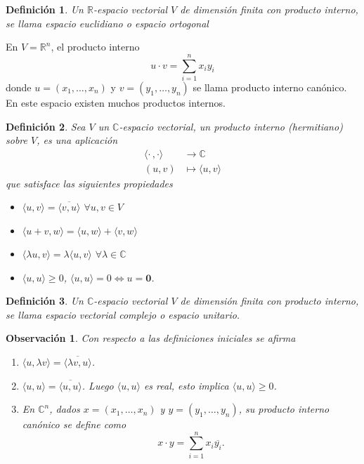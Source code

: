 \documentclass[b5paper, 11pt]{book}
\newcommand{\0}{\mathbf{0}}
\newcommand{\R}{\mathds{R}}
\newtheorem{obs}{Observación}[chapter]
\theoremstyle{estiloB}
\theoremstyle{estiloC}
\newtheorem{unadefi}{Definición}[chapter]
\theoremstyle{estiloD}
\begin{document}
\begin{unadefi}
Un $\R$-espacio vectorial $V$ de dimensi\'on finita con producto interno, se llama espacio euclidiano o espacio ortogonal
\end{unadefi}

En $V= \R^{n}$, el producto interno
\[
u \cdot v= \sum_{i=1}^{n}x_{i}y_{i} 
\]
donde $u=(x_{1}, \ldots, x_{n})$ y $v=(y_{1}, \ldots , y_{n})$ se llama producto interno can\'onico. En este espacio existen muchos productos internos.

\begin{unadefi}
Sea $V$ un $\mathds{C}$-espacio vectorial, un producto interno (hermitiano) sobre $V$, es una aplicaci\'on
\begin{align*}
\langle \mathbf{\cdot} \, , \mathbf{\cdot} \rangle	&\to \mathds{C}\\
(u,v)							&\mapsto \langle u, v \rangle
\end{align*}
que satisface las siguientes propiedades
\begin{itemize}
\item[\textit{i)}] $\langle u,v \rangle = \overline{\langle v,u\rangle}$ $\forall u,v \in V$
\item[\textit{ii)}] $\langle u+v, w \rangle= \langle u,w \rangle + \langle v,w \rangle$
\item[\textit{iii)}] $\langle \lambda u, v \rangle= \lambda \langle u,v \rangle$ $\forall \lambda \in \mathds{C}$
\item[\textit{iv)}] $\langle u,u \rangle \geq 0$, $\langle u,u \rangle=0 \Longleftrightarrow u= \0$.
\end{itemize}
\end{unadefi}

\begin{unadefi}
Un $\mathds{C}$-espacio vectorial $V$ de dimensi\'on finita con producto interno, se llama espacio vectorial complejo o espacio unitario.
\end{unadefi}
\begin{obs}Con respecto a las definiciones iniciales se afirma
\begin{enumerate}
\item $\langle u, \lambda v \rangle= \overline{\langle \lambda v, u \rangle}$.
\item $\langle u,u \rangle= \overline{\langle u,u \rangle}$. Luego $\langle u,u \rangle$ es real, esto implica $\langle u,u \rangle \geq 0$.
\item En $\mathds{C}^{n}$, dados $x= (x_1, \ldots , x_n)$ y $y= (y_{1}, \ldots , y_{n})$, su producto interno can\'onico se define como
\[
x \cdot y= \sum_{i=1}^{n} x_{i}\overline{y_{i}}.
\]
\end{enumerate}
\end{obs}
\end{document}
